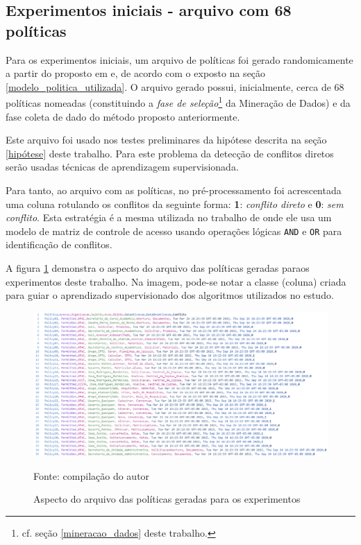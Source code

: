 \subsection{Experimentos iniciais - arquivo com 68 políticas}
Para os experimentos iniciais, um arquivo de políticas foi gerado randomicamente a partir do proposto em \cite{sarkis2017} e, de acordo com o exposto na seção \ref{modelo_politica_utilizada}. O arquivo gerado possui, inicialmente, cerca de 68 políticas nomeadas (constituindo a \textit{fase de seleção}\footnote{cf. seção \ref{mineracao_dados} deste trabalho.} da Mineração de Dados) e da fase coleta de dado do método proposto anteriormente. 

Este arquivo foi usado nos testes preliminares da hipótese descrita na seção \ref{hipótese} deste trabalho. Para este problema da detecção de conflitos diretos serão usadas técnicas de aprendizagem supervisionada. 

Para tanto, ao arquivo com as políticas, no pré-processamento foi acrescentada uma coluna rotulando os conflitos da seguinte forma: \textbf{1}: \textit{conflito direto} e \textbf{0}: \textit{sem conflito}. Esta estratégia é a mesma utilizada no trabalho de \cite{davy_application_2008} onde ele usa um modelo de matriz de controle de acesso usando operações lógicas \texttt{AND} e \texttt{OR} para identificação de conflitos.

A figura \ref{fig:aspecto_arquivo} demonstra o aspecto do arquivo das políticas geradas paraos experimentos deste trabalho. Na imagem, pode-se notar a classe (coluna) criada para guiar o aprendizado supervisionado dos algoritmos utilizados no estudo.

\begin{figure}[h!]
	\centering
	\includegraphics[width=.8\textwidth]{imagens/aspecto_arquivo_politicas.png}	
	\caption{Aspecto do arquivo das políticas geradas para os experimentos}
	\label{fig:aspecto_arquivo}
	{\scriptsize Fonte: compilação do autor}
\end{figure}

